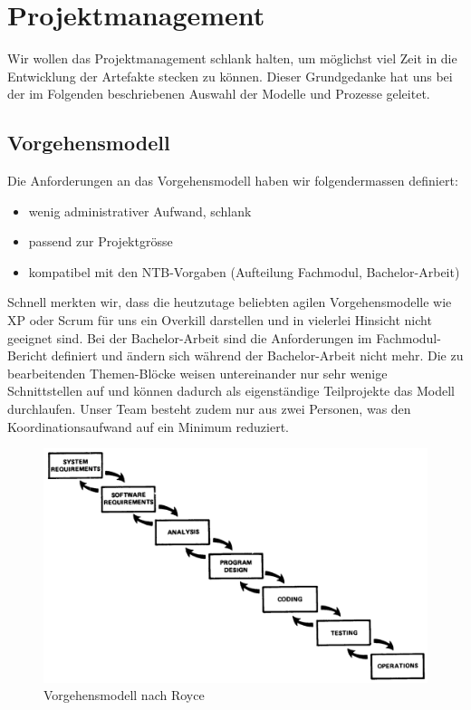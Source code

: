\section{Projektmanagement}
Wir wollen das Projektmanagement schlank halten, um möglichst viel Zeit in die Entwicklung der Artefakte stecken zu können.
Dieser Grundgedanke hat uns bei der im Folgenden beschriebenen Auswahl der Modelle und Prozesse geleitet.

\subsection{Vorgehensmodell}

Die Anforderungen an das Vorgehensmodell haben wir folgendermassen definiert:
\begin{itemize}  
\item wenig administrativer Aufwand, schlank
\item passend zur Projektgrösse
\item kompatibel mit den NTB-Vorgaben (Aufteilung Fachmodul, Bachelor-Arbeit)
\end{itemize}

Schnell merkten wir, dass die heutzutage beliebten agilen Vorgehensmodelle wie XP oder Scrum für uns ein Overkill darstellen und in vielerlei Hinsicht nicht geeignet sind. Bei der Bachelor-Arbeit sind die Anforderungen im Fachmodul-Bericht definiert und ändern sich während der Bachelor-Arbeit nicht mehr. Die zu bearbeitenden Themen-Blöcke weisen untereinander nur sehr wenige Schnittstellen auf und können dadurch als eigenständige Teilprojekte das Modell durchlaufen. Unser Team besteht zudem nur aus zwei Personen, was den Koordinationsaufwand auf ein Minimum reduziert.

\begin{figure}[htbp]
	\centering
	\includegraphics[width=0.9\linewidth]{img/royce-largePrograms}
	\caption{Vorgehensmodell nach Royce}
	\label{img:royce-largePrograms}
\end{figure}


